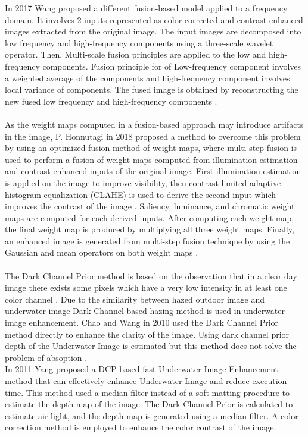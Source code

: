 \documentclass[a4paper,11pt,oneside]{article}
\begin{document}
  In 2017 Wang \cite{12} proposed a different fusion-based model applied to a frequency domain. It involves 2 inputs represented as color corrected and contrast enhanced images extracted from the original image. The input images are decomposed into low frequency and high-frequency components using a three-scale wavelet operator. Then, Multi-scale fusion principles are applied to the low and high-frequency components. Fusion principle for of Low-frequency component involves a weighted average of the components and high-frequency component involves local variance of components. The fused image is obtained by reconstructing the new fused low frequency and high-frequency components \cite{12}.\\
  \\
  As the weight maps computed in a fusion-based approach may introduce artifacts in the image, P. Honnutagi in 2018 \cite{10} proposed a method to overcome this problem by using an optimized fusion method of weight maps, where multi-step fusion is used to perform a fusion of weight maps computed from illumination estimation and contrast-enhanced inputs of the original image. First illumination estimation is applied on the image to improve visibility, then contrast limited adaptive histogram equalization (CLAHE) is used to derive the second input which improves the contrast of the image \cite{10}. Saliency, luminance, and chromatic weight maps are computed for each derived inputs. After computing each weight map, the final weight map is produced by multiplying all three weight maps. Finally, an enhanced image is generated from multi-step fusion technique by using the Gaussian and mean operators on both weight maps \cite{10}.\\
  \\
  The Dark Channel Prior method is based on the observation that in a clear day image there exists some pixels which have a very low intensity in at least one color channel \cite{15}. Due to the similarity between hazed outdoor image and underwater image Dark Channel-based hazing method is used in underwater image enhancement. Chao and Wang in 2010 \cite{25} used the Dark Channel Prior method directly to enhance the clarity of the image. Using dark channel prior depth of the Underwater Image is estimated but this method does not solve the problem of absoption \cite{25}.\\
 In 2011 Yang \cite{8} proposed a DCP-based fast Underwater Image Enhancement method that can effectively enhance Underwater Image and reduce execution time. This method used a median filter instead of a soft matting procedure to estimate the depth map of the image. The Dark Channel Prior is calculated to estimate air-light, and the depth map is generated using a median filter. A color correction method is employed to enhance the color contrast of the image.\cite{8}\\
\end{document}
